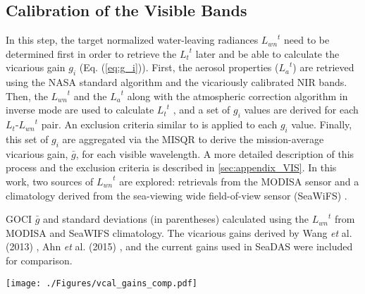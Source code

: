 \documentclass[10pt]{article}
\begin{document}
\subsection{Calibration of the Visible Bands}
\label{sec:vcal_vis}
In this step, the target normalized water-leaving radiances ${L_{wn}}^t$ need to be determined first in order to retrieve the  ${L_t}^t$ later and be able to calculate the vicarious gain $g_i$ (Eq. (\ref{eq:g_i})). First, the aerosol properties (${L_a}^t$) are retrieved using the NASA standard algorithm \cite{Mobley2016} and the vicariously calibrated NIR bands. Then, the ${L_{wn}}^t$ and the ${L_a}^t$ along with the atmospheric correction algorithm in inverse mode are used to calculate ${L_t}^t$ \cite{Franz:07}, and a set of $g_i$ values are derived for each $L_t$-${L_{wn}}^t$ pair. An exclusion criteria similar to \cite{Bailey2006} is applied to each $g_i$ value. Finally, this set of $g_i$ are aggregated via the MISQR to derive the mission-average vicarious gain, $\bar{g}$, for each visible wavelength. A more detailed description of this process and the exclusion criteria is described in \autoref{sec:appendix_VIS}. In this work, two sources of ${L_{wn}}^t$ are explored: retrievals from the MODISA sensor and a climatology derived from the sea-viewing wide field-of-view sensor (SeaWiFS) \cite{McClain2004}. 

\begin{table}[htbp!]
\caption{GOCI $\bar{g}$ and standard deviations (in parentheses) calculated using the ${L_{wn}}^t$ from MODISA and SeaWIFS climatology. The vicarious gains derived by Wang {\it et} al. (2013) \cite{Wang:13}, Ahn {\it et} al. (2015) \cite{Ahn2015}, and the current gains used in SeaDAS were included for comparison. \label{tab:vcal_gains_comp}}

  \centering
    \texttt{[image: ./Figures/vcal\_gains\_comp.pdf]}

\end{table}
\end{document}
